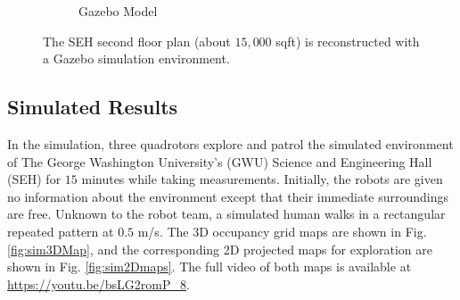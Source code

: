 \documentclass[smallextended]{svjour3}       %
\begin{document}
\begin{figure}[!t]
\begin{subfigure}[t]{0.4\columnwidth}
        		\caption{Gazebo Model}
    	\end{subfigure}
	\caption{The SEH second floor plan (about $15,000$ sqft) is reconstructed with a Gazebo simulation environment.}
	\label{fig:SEHEnvironment}
\end{figure}


\subsection{Simulated Results}

In the simulation, three quadrotors explore and patrol the simulated environment of The George Washington University's (GWU) Science and Engineering Hall (SEH) for $15$ minutes while taking measurements. Initially, the robots are given no information about the environment except that their immediate surroundings are free. Unknown to the robot team, a simulated human walks in a rectangular repeated pattern at $0.5$ m/s. The 3D occupancy grid maps are shown in Fig. \ref{fig:sim3DMap}, and the corresponding 2D projected maps for exploration are shown in Fig. \ref{fig:sim2Dmaps}. The full video of both maps is available at \href{https://youtu.be/bsLG2romP_8}{https://youtu.be/bsLG2romP\_8}.
\end{document}

